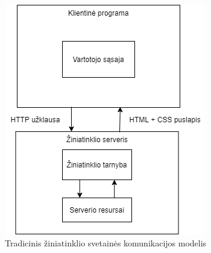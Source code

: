 \begin{figure}[htp!]
\centering
\includegraphics[scale=0.6]{img/Traditional_Web_Model.png}
\caption{Tradicinis žiniatinklio svetainės komunikacijos modelis \cite{AJAXCrawlResearch}}
\label{fig:traditional_web_model}
\end{figure}